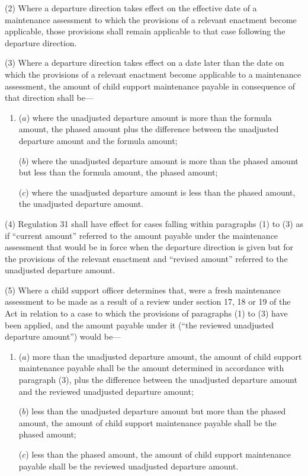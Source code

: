 \documentclass[a4paper]{article}
\begin{document}
(2) Where a departure direction takes effect on the effective date of a
maintenance assessment to which the provisions of a relevant enactment become
applicable, those provisions shall remain applicable to that case following the
departure direction.

(3) Where a departure direction takes effect on a date later than the date on
which the provisions of a relevant enactment become applicable to a maintenance
assessment, the amount of child support maintenance payable in consequence of
that direction shall be—
\begin{enumerate}\item[]
($a$) where the unadjusted departure amount is more than the formula amount, the
phased amount plus the difference between the unadjusted departure amount and
the formula amount;

($b$) where the unadjusted departure amount is more than the phased amount but less
than the formula amount, the phased amount;

($c$) where the unadjusted departure amount is less than the phased amount, the
unadjusted departure amount.
\end{enumerate}

(4) Regulation 31 shall have effect for cases falling within paragraphs (1) to
(3) as if “current amount” referred to the amount payable under the maintenance
assessment that would be in force when the departure direction is given but for
the provisions of the relevant enactment and “revised amount” referred to the
unadjusted departure amount.

(5) Where a child support officer determines that, were a fresh maintenance
assessment to be made as a result of a review under section 17, 18 or 19 of the
Act in relation to a case to which the provisions of paragraphs (1) to (3) have
been applied, and the amount payable under it (“the reviewed unadjusted
departure amount”) would be—
\begin{enumerate}\item[]
($a$) more than the unadjusted departure amount, the amount of child support
maintenance payable shall be the amount determined in accordance with paragraph
(3), plus the difference between the unadjusted departure amount and the
reviewed unadjusted departure amount;

($b$) less than the unadjusted departure amount but more than the phased amount,
the amount of child support maintenance payable shall be the phased amount;

($c$) less than the phased amount, the amount of child support maintenance payable
shall be the reviewed unadjusted departure amount.
\end{enumerate}
\end{document}
